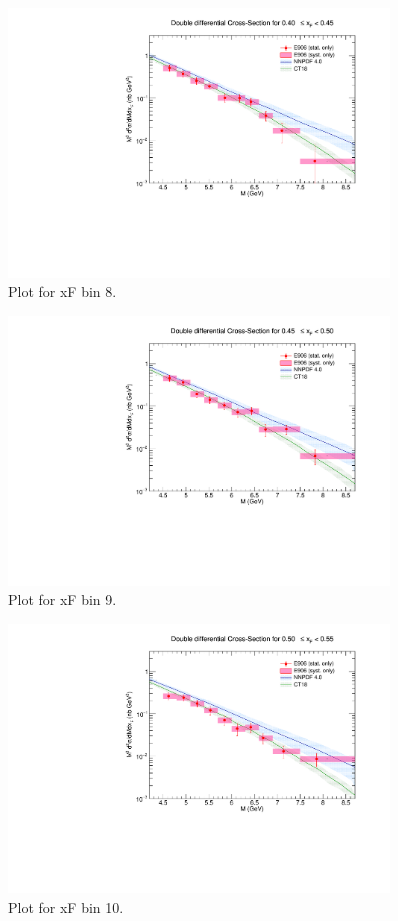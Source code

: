 \begin{figure}[p]
\centering
\includegraphics[width=0.9\textwidth]{./XSecPlots/LH2_8_roofit.pdf}
\caption{Plot for xF bin 8.}
\end{figure}
\clearpage

\begin{figure}[p]
\centering
\includegraphics[width=0.9\textwidth]{./XSecPlots/LH2_9_roofit.pdf}
\caption{Plot for xF bin 9.}
\end{figure}
\clearpage

\begin{figure}[p]
\centering
\includegraphics[width=0.9\textwidth]{./XSecPlots/LH2_10_roofit.pdf}
\caption{Plot for xF bin 10.}
\end{figure}
\clearpage

